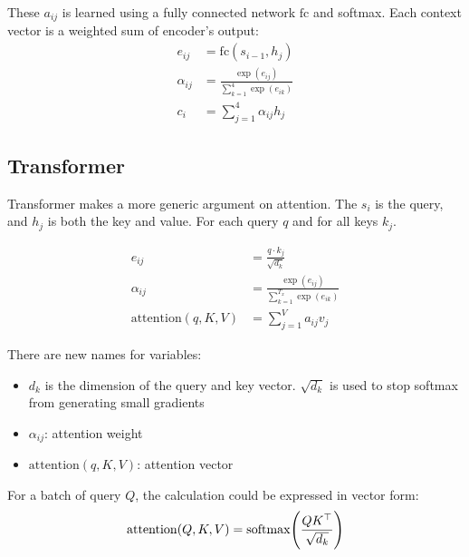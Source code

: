  These $a_{ij}$ is learned using a fully connected network $\mathrm{fc}$ and softmax. Each context vector is a weighted sum of encoder's output:
\begin{equation}
    \begin{aligned}
        e_{ij} &= \mathrm{fc}(s_{i-1}, h_j) \\
        \alpha_{ij} &= \frac{\exp(e_{ij})}{\displaystyle \sum_{k=1}^4 \exp(e_{ik})} \\
        c_i &= \sum_{j=1}^4 \alpha_{ij} h_j
    \end{aligned}
\end{equation}


\subsection{Transformer}

\begin{definition}
    Transformer makes a more generic argument on attention. The $s_i$ is the query, and $h_j$ is both the key and value. For each query $q$ and for all keys $k_j$.

\begin{equation}
    \begin{aligned}
        e_{ij} &= \frac{q \cdot k_j}{\sqrt{d_k}} \\
        \alpha_{ij} &= \frac{\exp(e_{ij})}{\displaystyle \sum_{k=1}^{T_x} \exp(e_{ik})} \\
        \mathrm{attention}(q, K, V) &= \sum_{j=1}^{V} a_{ij} v_j
    \end{aligned}
\end{equation}

There are new names for variables:
\begin{itemize}
    \item $d_k$ is the dimension of the query and key vector. $\sqrt{d_k}$ is used to stop softmax from generating small gradients
    \item $\alpha_{ij}$: attention weight
    \item $\mathrm{attention}(q, K, V)$: attention vector
\end{itemize}

For a batch of query $Q$, the calculation could be expressed in vector form:
\begin{equation}
    \mathrm{attention}(Q, K, V) = \mathrm{softmax}\mleft( \frac{Q \transpose{K}}{\sqrt{d_k}} \mright)
\end{equation}
\end{definition}


